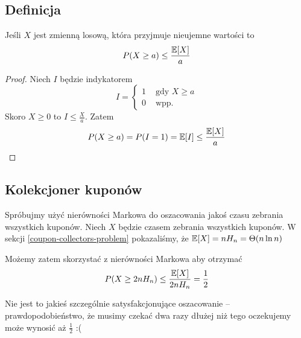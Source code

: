 \subsection{Definicja}
\begin{theorem}
    Jeśli \( X \) jest zmienną losową, która przyjmuje nieujemne wartości to
    \[
        P(X \geq a) \leq \frac{\expected{X}}{a}
    \]
\end{theorem}
\begin{proof}
    Niech \( I \) będzie indykatorem
    \[
        I = \begin{cases}
            1 & \text{ gdy } X \geq a \\
            0 & \text{ wpp. }
        \end{cases}
    \]
    Skoro \( X \geq 0 \) to \( I \leq \frac{X}{a} \).
    Zatem
    \[
        P(X \geq a) = P(I = 1) = \expected{I} \leq \frac{\expected{X}}{a}
    \]
\end{proof}

\subsection{Kolekcjoner kuponów}
Spróbujmy użyć nierówności Markowa do oszacowania jakoś czasu zebrania wszystkich kuponów.
Niech \( X \) będzie czasem zebrania wszystkich kuponów.
W sekcji \ref{coupon-collectors-problem} pokazaliśmy, że \( \expected{X} = nH_n = \Theta(n \ln n) \)

Możemy zatem skorzystać z nierówności Markowa aby otrzymać
\[
    P(X \geq 2n H_n) \leq \frac{\expected{X}}{2n H_n} = \frac{1}{2}
\]

Nie jest to jakieś szczególnie satysfakcjonujące oszacowanie -- prawdopodobieństwo, że musimy czekać dwa
razy dłużej niż tego oczekujemy może wynosić aż \( \frac{1}{2} \) :(
